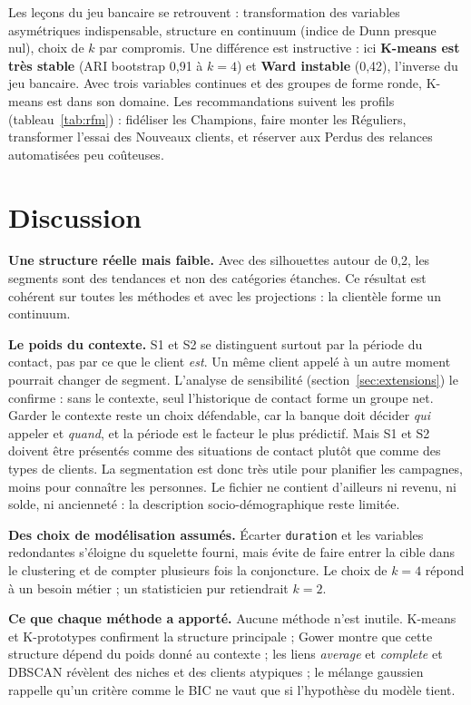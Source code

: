 \documentclass[11pt,a4paper]{article}
\begin{document}
Les leçons du jeu bancaire se retrouvent : transformation des variables asymétriques indispensable, structure en continuum (indice de Dunn presque nul), choix de $k$ par compromis. Une différence est instructive : ici \textbf{K-means est très stable} (ARI bootstrap 0,91 à $k=4$) et \textbf{Ward instable} (0,42), l'inverse du jeu bancaire. Avec trois variables continues et des groupes de forme ronde, K-means est dans son domaine. Les recommandations suivent les profils (tableau~\ref{tab:rfm}) : fidéliser les Champions, faire monter les Réguliers, transformer l'essai des Nouveaux clients, et réserver aux Perdus des relances automatisées peu coûteuses.

\section{Discussion}

\textbf{Une structure réelle mais faible.} Avec des silhouettes autour de 0,2, les segments sont des tendances et non des catégories étanches. Ce résultat est cohérent sur toutes les méthodes et avec les projections : la clientèle forme un continuum.

\textbf{Le poids du contexte.} S1 et S2 se distinguent surtout par la période du contact, pas par ce que le client \emph{est}. Un même client appelé à un autre moment pourrait changer de segment. L'analyse de sensibilité (section~\ref{sec:extensions}) le confirme : sans le contexte, seul l'historique de contact forme un groupe net. Garder le contexte reste un choix défendable, car la banque doit décider \emph{qui} appeler et \emph{quand}, et la période est le facteur le plus prédictif. Mais S1 et S2 doivent être présentés comme des situations de contact plutôt que comme des types de clients. La segmentation est donc très utile pour planifier les campagnes, moins pour connaître les personnes. Le fichier ne contient d'ailleurs ni revenu, ni solde, ni ancienneté : la description socio-démographique reste limitée.

\textbf{Des choix de modélisation assumés.} Écarter \texttt{duration} et les variables redondantes s'éloigne du squelette fourni, mais évite de faire entrer la cible dans le clustering et de compter plusieurs fois la conjoncture. Le choix de $k=4$ répond à un besoin métier ; un statisticien pur retiendrait $k=2$.

\textbf{Ce que chaque méthode a apporté.} Aucune méthode n'est inutile. K-means et K-prototypes confirment la structure principale ; Gower montre que cette structure dépend du poids donné au contexte ; les liens \emph{average} et \emph{complete} et DBSCAN révèlent des niches et des clients atypiques ; le mélange gaussien rappelle qu'un critère comme le BIC ne vaut que si l'hypothèse du modèle tient.
\end{document}

